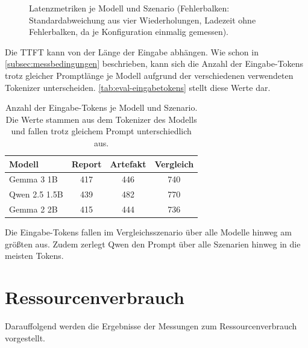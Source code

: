\begin{figure}[H]
    \caption{Latenzmetriken je Modell und Szenario (Fehlerbalken: Standardabweichung aus vier Wiederholungen, Ladezeit ohne Fehlerbalken, da je Konfiguration einmalig gemessen).}
    \label{fig:eval-latenz}
\end{figure}
\newpage

\noindent Die \ac{TTFT} kann von der Länge der Eingabe abhängen. Wie schon in \autoref{subsec:messbedingungen} beschrieben, kann sich die Anzahl der Eingabe-Tokens trotz gleicher Promptlänge je Modell aufgrund der verschiedenen verwendeten Tokenizer unterscheiden. \autoref{tab:eval-eingabetokens} stellt diese Werte dar.

\begin{table}[H]
    \centering
    \caption[Eingabe-Tokens]{Anzahl der Eingabe-Tokens je Modell und Szenario. Die Werte stammen aus dem Tokenizer des Modells und fallen trotz gleichem Prompt unterschiedlich aus.}
    \label{tab:eval-eingabetokens}
    \begin{tabular}{l c c c}
        \toprule
        \textbf{Modell} & \textbf{Report} & \textbf{Artefakt} & \textbf{Vergleich} \\
        \midrule
        Gemma 3 1B    & 417 & 446 & 740 \\
        Qwen 2.5 1.5B & 439 & 482 & 770 \\
        Gemma 2 2B    & 415 & 444 & 736 \\
        \bottomrule
    \end{tabular}
\end{table}

\noindent Die Eingabe-Tokens fallen im Vergleichsszenario über alle Modelle hinweg am größten aus. Zudem zerlegt Qwen den Prompt über alle Szenarien hinweg in die meisten Tokens.
\section{Ressourcenverbrauch}
\label{sec:eval-ressourcen}
Darauffolgend werden die Ergebnisse der Messungen zum Ressourcenverbrauch vorgestellt.

